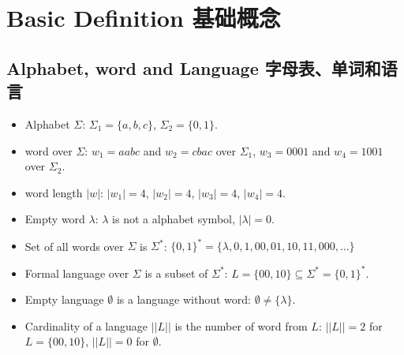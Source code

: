 \documentclass[a4paper,11pt,utf8]{article}
\title{\text{Theoretical Computer Science Summary}}
\author{玄风}
\date{}
\begin{document}
\maketitle
\thispagestyle{empty}
\newpage
{}
\tableofcontents
\thispagestyle{empty}
\newpage

\clearpage
{}
\setcounter{page}{1} 


\section{Basic Definition 基础概念}
\subsection{Alphabet, word and Language 字母表、单词和语言}
\begin{itemize}
    \item Alphabet $\Sigma$: $\Sigma_1 = \{a,b,c\}$, $\Sigma_2 = \{0,1\}$.
    \item word over $\Sigma$: $w_1 = aabc$ and $w_2 = cbac$ over $\Sigma_1$, $w_3 = 0001$ and $w_4 = 1001$ over $\Sigma_2$.
    \item word length $|w|$: $|w_1| = 4$, $|w_2| = 4$, $|w_3| = 4$, $|w_4| = 4$.
    \item Empty word $\lambda$: $\lambda$ is not a alphabet symbol, $|\lambda| = 0$.
    \item Set of all words over $\Sigma$ is $\Sigma^*$: $\{0,1\}^* = \{\lambda, 0, 1, 00, 01, 10, 11, 000, \dots\}$
    \item Formal language over $\Sigma$ is a subset of $\Sigma^*$: $L = \{00,10\} \subseteq \Sigma^* = \{0,1\}^*$.
    \item Empty language $\emptyset$ is a language without word: $\emptyset \neq \{\lambda\}$.
    \item Cardinality of a language $||L||$ is the number of word from $L$: $||L|| = 2$ for $L = \{00,10\}$, $||L|| = 0$ for $\emptyset$.
\end{itemize}
\end{document}
